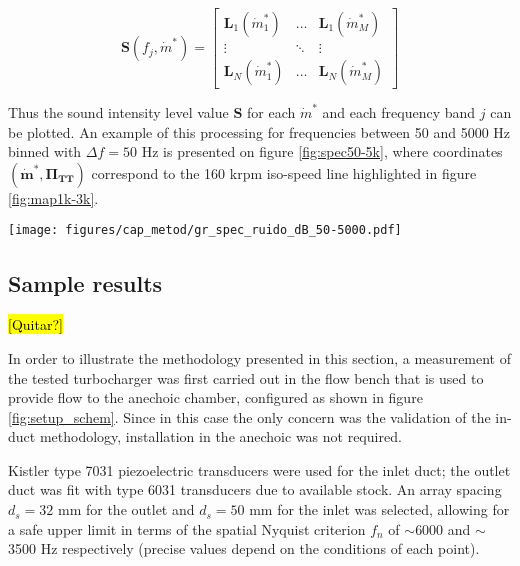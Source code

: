 \begin{equation}
  \mathbf S(f_j,\dot m^*)=\begin{bmatrix}
    \mathbf L_1(\dot m^*_1) & \hdots & \mathbf L_1(\dot m^*_M)\\
    \vdots & \ddots & \vdots \\
    \mathbf L_N(\dot m^*_1) & \hdots & \mathbf L_N(\dot m^*_M)
  \end{bmatrix}
\end{equation}

Thus the sound intensity level value $\mathbf S$ for each $\dot m^*$ and each frequency band $j$ can be plotted. An example of this processing for frequencies between 50 and 5000 Hz binned with $\Delta f = 50$ Hz is presented on figure \ref{fig:spec50-5k}, where coordinates $(\bm{\dot{m}^*},\bm{\Pi_\text{TT}})$ correspond to the 160 krpm iso-speed line highlighted in figure \ref{fig:map1k-3k}.

\begin{figure*}[t!]
\centering
\texttt{[image: figures/cap\_metod/gr\_spec\_ruido\_dB\_50-5000.pdf]}
\caption{Sample of spectrograms calculated using the procedure outlined in subsection \ref{sub:noise_maps_and_spectrograms}, following the 160 krpm paths marked in figure \ref{fig:map1k-3k}. The 1--3 kHz band selected for the maps in figure \ref{fig:map1k-3k} is highlighted, along with some particular flow phenomena discussed in section \ref{sec:results_and_discussion}.}
\label{fig:spec50-5k}
\end{figure*}

\subsection{Sample results}

\hl{[Quitar?]}

In order to illustrate the methodology presented in this section, a measurement of the tested turbocharger was first carried out in the flow bench that is used to provide flow to the anechoic chamber, configured as shown in figure \ref{fig:setup_schem}. Since in this case the only concern was the validation of the in-duct methodology, installation in the anechoic was not required. 

Kistler type 7031 piezoelectric transducers were used for the inlet duct; the outlet duct was fit with type 6031 transducers due to available stock. An array spacing $d_s=32$ mm for the outlet and $d_s=50$ mm for the inlet was selected, allowing for a safe upper limit in terms of the spatial Nyquist criterion $f_n$ of $\sim$6000 and $\sim$3500 Hz respectively (precise values depend on the conditions of each point).

